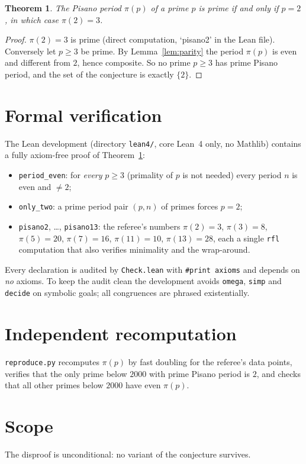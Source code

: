 \documentclass[11pt]{article}
\newtheorem{theorem}{Theorem}
\begin{document}
\begin{theorem}\label{thm:main}
The Pisano period $\pi(p)$ of a prime $p$ is prime if and only if $p=2$,
in which case $\pi(2)=3$.
\end{theorem}

\begin{proof}
$\pi(2)=3$ is prime (direct computation, `pisano2' in the Lean file).
Conversely let $p\ge 3$ be prime.  By Lemma~\ref{lem:parity} the period
$\pi(p)$ is even and different from $2$, hence composite.  So no prime
$p\ge 3$ has prime Pisano period, and the set of the conjecture is exactly
$\{2\}$.
\end{proof}

\section{Formal verification}

The Lean development (directory \texttt{lean4/}, core Lean~4 only, no
Mathlib) contains a fully axiom-free proof of Theorem~\ref{thm:main}:
\begin{itemize}
\item \texttt{period\_even}: for \emph{every} $p\ge 3$ (primality of $p$ is
not needed) every period $n$ is even and $\ne 2$;
\item \texttt{only\_two}: a prime period pair $(p,n)$ of primes forces
$p=2$;
\item \texttt{pisano2}, \dots, \texttt{pisano13}: the referee's numbers
$\pi(2){=}3$, $\pi(3){=}8$, $\pi(5){=}20$, $\pi(7){=}16$, $\pi(11){=}10$,
$\pi(13){=}28$, each a single \texttt{rfl} computation that also verifies
minimality and the wrap-around.
\end{itemize}
Every declaration is audited by \texttt{Check.lean} with
\texttt{\#print axioms} and depends on \emph{no} axioms.  To keep the audit
clean the development avoids \texttt{omega}, \texttt{simp} and
\texttt{decide} on symbolic goals; all congruences are phrased
existentially.

\section{Independent recomputation}

\texttt{reproduce.py} recomputes $\pi(p)$ by fast doubling for the
referee's data points, verifies that the only prime below $2000$ with
prime Pisano period is $2$, and checks that all other primes below $2000$
have even $\pi(p)$.

\section{Scope}

The disproof is unconditional: no variant of the conjecture survives.
\end{document}
